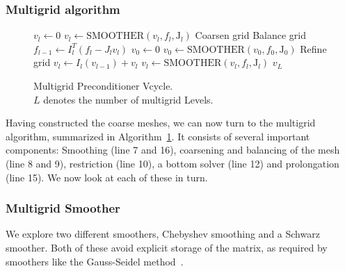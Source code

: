 \subsubsection{Multigrid algorithm}
\begin{figure}
  \begin{algorithm}[H]
    \caption{\label{alg:Multigrid_Vcycle}
      Multigrid Preconditioner Vcycle.\\
      $L$ denotes the number of multigrid Levels.}
    \begin{algorithmic}[1]
      \State $v_l \leftarrow 0$
      \State $v_l \leftarrow \text{SMOOTHER}(v_l,f_l,\mathrm{J}_l)$ 
      \State Coarsen grid
      \State Balance grid
      \State $f_{l-1} \leftarrow I_l^T(f_l - J_lv_l)$ 
      \EndFor
      \State $v_0 \leftarrow 0$
      \State $v_0 \leftarrow \text{SMOOTHER}(v_0,f_0,\mathrm{J}_0)$ 
      \State Refine grid
      \State $v_l \leftarrow I_l(v_{l-1}) + v_{l}$ 
      \State $v_l \leftarrow \text{SMOOTHER}(v_l,f_l,\mathrm{J}_l)$ 
      \EndFor
      \State \Return $v_L$
      \EndFunction
    \end{algorithmic}
  \end{algorithm}
\end{figure}
%
%
Having constructed the coarse meshes, we can now turn to the
  multigrid algorithm, summarized in
  Algorithm~\ref{alg:Multigrid_Vcycle}.  It consists of several
  important components: Smoothing (line 7 and 16), coarsening and
  balancing of the mesh (line 8 and 9), restriction (line 10), a
  bottom solver (line 12) and prolongation (line 15). We now look
  at each of these in turn.
%
%
%
\subsubsection{Multigrid Smoother}
%
We explore two different smoothers, Chebyshev smoothing and a Schwarz smoother.  Both of these avoid explicit storage of the matrix, as required by smoothers like the Gauss-Seidel method~\cite{shang2009distributed}.

